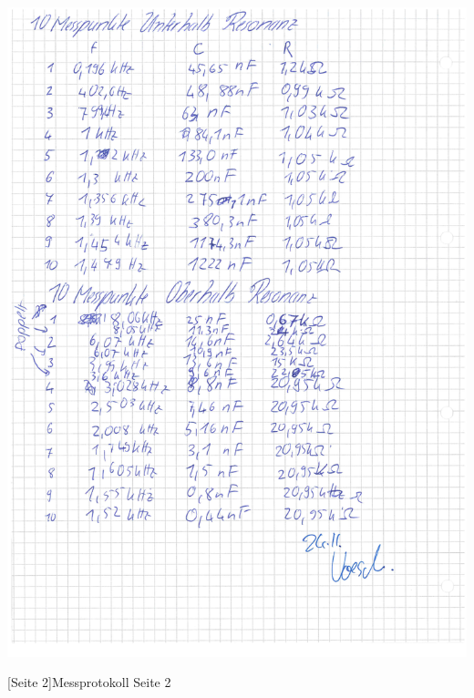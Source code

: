 \documentclass[12pt,a4paper,]{scrreprt}
\begin{document}
        \begin{center}
    		\includegraphics[scale=0.65]{Daten/2.jpg}
    	\end{center}
    	[Seite 2]{Messprotokoll Seite 2}
    	\pagebreak
	\pagebreak
\end{document}
